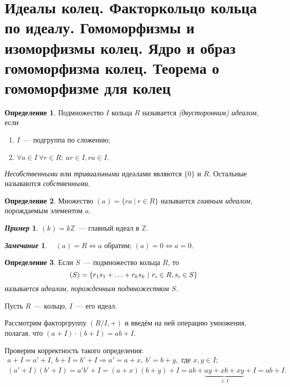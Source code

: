 \documentclass[a4paper, 14pt]{extarticle}
\newcommand{\n}{\par}
\newcommand{\integers}{\mathbb{Z}}
\theoremstyle{definition}
\newtheorem*{exmpl*}{\textit{Пример}}
\newtheorem*{remark}{\textit{Замечание}}
\newtheorem{definition}{Определение}
\theoremstyle{plain}
\numberwithin{theorem}{section}
\numberwithin{definition}{section}
\numberwithin{statement}{section}
\numberwithin{lemma}{section}
\numberwithin{consequence}{section}
\begin{document}
	\section{Идеалы колец. Факторкольцо кольца по идеалу. Гомоморфизмы и изоморфизмы колец. Ядро и образ гомоморфизма колец. Теорема о гомоморфизме для колец}
		\setcounter{definition}{0}
		\begin{definition}
			Подмножество $I$ кольца $R$ называется \textit{(двусторонним) идеалом,} если
			\begin{enumerate}
				\setlength\itemsep{0.1em}
				\item $I$~--- подгруппа по сложению;
				\item $\forall a \in I \ \forall r \in R{:} \ ar \in I, ra \in I.$
			\end{enumerate} \n
			\textit{Несобственными} или \textit{тривиальными} идеалами являются $\{0\}$ и $R$. Остальные называются \textit{собственными}.
		\end{definition}
		\begin{definition}
			Множество ${(a) = \{ra \ | \ r \in R\}}$ называется \textit{главным идеалом}, порождаемым элементом $a.$
		\end{definition}
		\begin{exmpl*}
			${(k) = k\integers}$~--- главный идеал в $\integers.$
		\end{exmpl*}
		\begin{remark}
			\ \newline
			$(a) = R \Longleftrightarrow a$ обратим; \newline
			$(a) = 0 \Longleftrightarrow a = 0.$
		\end{remark}
		\begin{definition}
			Если $S$~--- подмножество кольца $R$, то
			\begin{equation*}
				(S) = \{r_1 s_1 + \mathellipsis + r_k s_k \ | \ r_i \in R, s_i \in S\}
			\end{equation*}
			называется \textit{идеалом, порожденным подмножеством $S$.}
		\end{definition}
		Пусть $R$~--- кольцо, $I$~--- его идеал. \n
		Рассмотрим факторгруппу $(R/I, +)$ и введём на ней операцию умножения, полагая, что ${(a + I) \cdot (b + I) = ab + I.}$ \n
		Проверим корректность такого определения:
		\begin{equation*}
		\begin{gathered}
			{a + I = a' + I, \ b + I = b' + I \Longrightarrow a' = a + x, \ b' = b + y, \text{ где } x, y \in I;} \\
			{(a' + I)(b' + I) =  a'b' + I =(a + x)(b + y) + I = ab + \underbrace{ay + xb + xy}_{\in I} + I = ab + I.}
		\end{gathered}
		\end{equation*}
\end{document}

